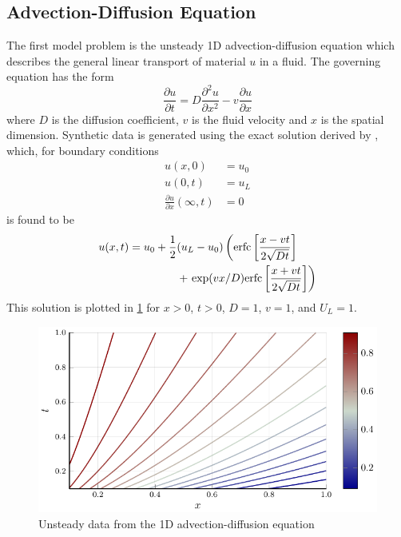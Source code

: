 \documentclass{article}
\begin{document}
\subsection{Advection-Diffusion Equation}

The first model problem is the unsteady 1D advection-diffusion equation which describes the general linear transport of material $u$ in a fluid. The governing equation has the form 
\begin{equation} 
\frac{\partial u}{\partial t} = D\frac{\partial^2 u}{\partial x^2} - v \frac{\partial u}{\partial x}
\end{equation}
where $D$ is the diffusion coefficient, $v$ is the fluid velocity and $x$ is the spatial dimension. Synthetic data is generated using the exact solution derived by \citet{van1982analytical}, which, for boundary conditions 
\begin{align}
  u(x,0) &= u_0 \\
  u(0,t) &= u_L \\
  \frac{\partial u}{\partial x}(\infty, t) &= 0
\end{align}
is found to be 
\begin{equation}
  \begin{split}
  u(x,t) = u_0 + \frac{1}{2}&(u_L - u_0) \left({\rm erfc}\left[ \frac{x - vt}{2\sqrt{Dt}}\right]\right. \\
  &+ \left.{\rm exp}(vx/D) {\rm erfc}\left[ \frac{x + vt}{2\sqrt{Dt}}\right] \right)
  \end{split}
\end{equation}
This solution is plotted in \cref{fig:advdif} for $x>0$, $t>0$, $D=1$, $v=1$, and $U_L = 1$.

\begin{figure}
\vskip 0.2in
\begin{center}
\centerline{\includegraphics[width=\columnwidth]{./figures/advdif}}
\caption{Unsteady data from the 1D advection-diffusion equation}
\label{fig:advdif}
\end{center}
\vskip -0.2in
\end{figure}
\end{document}
